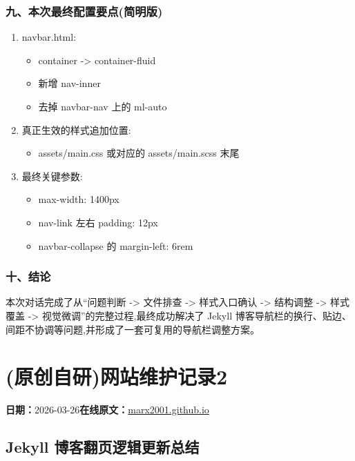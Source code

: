 \documentclass[lang=cn,scheme=chinese,color=blue,device=normal,toc=onecol,math=cm]{elegantbook}
\begin{document}
\subsubsection{九、本次最终配置要点(简明版)}


\begin{enumerate}
\item navbar.html: 
\begin{itemize}
\item container -> container-fluid
\item 新增 nav-inner
\item 去掉 navbar-nav 上的 ml-auto
\end{itemize}
\item 真正生效的样式追加位置: 
\begin{itemize}
\item assets/\allowbreak{}main.css 或对应的 assets/\allowbreak{}main.scss 末尾
\end{itemize}
\item 最终关键参数: 
\begin{itemize}
\item max-width: 1400px
\item nav-link 左右 padding: 12px
\item navbar-collapse 的 margin-left: 6rem
\end{itemize}
\end{enumerate}


\subsubsection{十、结论}


本次对话完成了从“问题判断 -> 文件排查 -> 样式入口确认 -> 结构调整 -> 样式覆盖 -> 视觉微调”的完整过程,最终成功解决了 Jekyll 博客导航栏的换行、贴边、间距不协调等问题,并形成了一套可复用的导航栏调整方案。\par



\section{(原创自研)网站维护记录2}
\begin{articlemeta}
\textbf{日期：}2026-03-26\hfill\textbf{在线原文：}\href{https://marx2001.github.io/sci-note\_posts/20260326speed}{marx2001.github.io}
\end{articlemeta}

\subsection{Jekyll 博客翻页逻辑更新总结}
\end{document}
